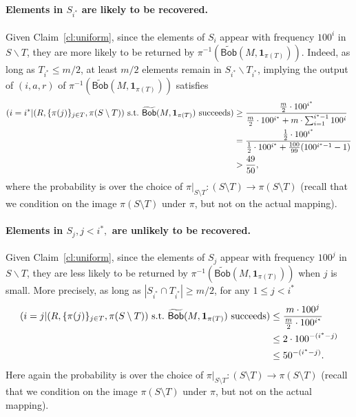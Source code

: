\documentclass[11pt]{article}
\let\Pr\relax
\DeclareMathOperator*{\Pr}{\mathbb{P}}
\newcommand{\query}{\mathsf{Bob}}
\begin{document}
\paragraph{Elements in $S_{i^*}$ are likely to be recovered.}   Given Claim~\ref{cl:uniform}, since the elements of $S_i$ appear with frequency $100^i$ in $S\backslash T$, they are more likely to be returned by $\pi^{-1}(\widetilde{\query}(M, \mathbf{1}_{\pi(T)}))$. Indeed, as long as $T_{i^*}\le m/2$, at least $m/2$ elements remain in $S_{i^*}\backslash T_{i^*}$, implying the output of $(i, a, r)$ of $\pi^{-1}(\widetilde{\query}(M, \mathbf{1}_{\pi(T)}))$ satisfies
\begin{equation}
\begin{split}
\Pr(i = i^* | (R, \{\pi(j)\}_{j\in T}, \pi(S\setminus T)) \text{~s.t.~}\widetilde{\query}(M, \mathbf{1}_{\pi(T)})\text{~succeeds}) &\ge \frac{\frac m2\cdot 100^{i^*}}{\frac m2\cdot 100^{i^*} + m\cdot \sum_{i=1}^{i^*-1} 100^i}\\
& = \frac{\frac 12\cdot 100^{i^*}}{\frac 12\cdot 100^{i^*} + \frac {100}{99}(100^{i^*-1} - 1)}\\
& > \frac{49}{50} , \label{eqn:istar-likely}
\end{split}
\end{equation}
where the probability is over the choice of $\pi|_{S\setminus T}:(S\setminus T)\to \pi(S\setminus T)$ (recall that we condition on the image $\pi(S\setminus T)$ under $\pi$, but not on the actual mapping).
\fi


\paragraph{Elements in $S_{j}, j<i^*,$ are unlikely to be recovered.} Given Claim~\ref{cl:uniform}, since the elements of $S_j$ appear with frequency $100^j$ in $S\backslash T$, they are less likely to be returned by $\pi^{-1}(\widetilde{\query}(M, \mathbf{1}_{\pi(T)}))$ when $j$ is small.  More precisely, as long as $|S_{i^*}\cap T_{i^*}|\geq m/2$, for any $1\le j< i^*$
\begin{equation}
\begin{split}
\Pr(i = j | (R, \{\pi(j)\}_{j\in T}, \pi(S\setminus T)) \text{~s.t.~}\widetilde{\query}(M, \mathbf{1}_{\pi(T)})\text{~succeeds})& \le \frac{m\cdot 100^j}{\frac m2\cdot 100^{i^*}}\\
& \le 2\cdot 100^{-(i^*-j)} \\
&\le 50^{-(i^*-j)} . \label{eqn:others-unlikely}
\end{split}
\end{equation}
Here again the probability is over the choice of $\pi|_{S\setminus T}:(S\setminus T)\to \pi(S\setminus T)$ (recall that we condition on the image $\pi(S\setminus T)$ under $\pi$, but not on the actual mapping).
\end{document}
